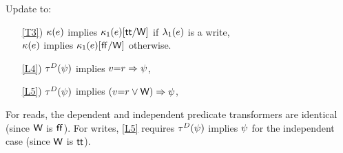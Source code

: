 \begin{definition}[\xRRD]
  \label{def:pomsets-rr}
  Update  to:
  \begin{enumerate}
  \item[\ref{T3})]
    $\kappa(e)$ implies
    $\kappa_1(e)[\mathsf{tt}/\mathsf{W}]$ if $\lambda_1(e)$ is a write,
    \\
    $\kappa(e)$ implies
    $\kappa_1(e)[\mkern.6mu\mathsf{ff}\mkern.6mu/\mathsf{W}]$ otherwise.
  \end{enumerate}
  \begin{enumerate}
  \item[\ref{L4})]
    $\aTr{\bEvs}{\bForm}$ implies $v{=}r\Rightarrow\psi$, 
  \item[\ref{L5})]
    $\aTr{\cEvs}{\bForm}$ implies $(v{=}r\lor\mathsf{W})\Rightarrow\psi$,
  \end{enumerate}  
\end{definition}
For reads, the dependent and independent predicate transformers are identical
(since $\mathsf{W}$ is $\mkern.6mu\mathsf{ff}\mkern.6mu$).  For writes, \ref{L5} requires
$\aTr{\cEvs}{\bForm}$ implies $\psi$ for the independent case (since $\mathsf{W}$
is $\mathsf{tt}$).

